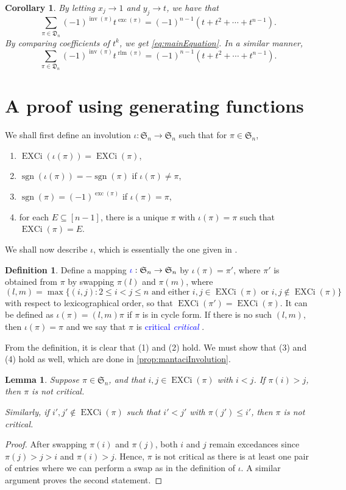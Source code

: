\documentclass[reqno]{amsart}
\newtheorem{lemma}[theorem]{Lemma}
\newtheorem{corollary}[theorem]{Corollary}
\theoremstyle{definition}
\newtheorem{definition}[theorem]{Definition}
\newcommand{\defin}[1]{%
\relax\ifmmode%
\textcolor{blue}{#1}%
\else\textcolor{blue}{\emph{#1}}%
\fi%
}
\newcommand{\symS}{\mathfrak{S}}
\newcommand{\dArr}{\mathfrak{D}}
\DeclareMathOperator{\inv}{inv}
\DeclareMathOperator{\sgn}{sgn}
\DeclareMathOperator{\exc}{exc}
\DeclareMathOperator{\EXCi}{EXCi}
\DeclareMathOperator{\rlm}{rlm}
\begin{document}
\begin{corollary}
By letting $x_j \to 1$ and $y_j \to t$, we have that 
\begin{equation*}
 \sum_{\pi \in \dArr_n} (-1)^{\inv(\pi)} t^{\exc(\pi)}
 =
 (-1)^{n-1}(t+t^2+\dotsb+t^{n-1}).
 \end{equation*}
By comparing coefficients of $t^k$,
we get \cref{eq:mainEquation}.
%
In a similar manner,
\begin{equation*}
\sum_{\pi \in \dArr_n} (-1)^{\inv(\pi)} t^{\rlm(\pi)}
 =
 (-1)^{n-1}(t+t^2+\dotsb+t^{n-1}).
\end{equation*}
\end{corollary}


\section{A proof using generating functions}\label{sec:genFunc}


We shall first define an involution
$\iota:\symS_n \to \symS_n$ such that for $\pi\in\symS_n$,
\begin{enumerate}
 \item $\EXCi(\iota(\pi))=\EXCi(\pi)$,
 \item $\sgn(\iota(\pi))=-\sgn(\pi)$ if $\iota(\pi)\neq\pi$,
 \item $\sgn(\pi)=(-1)^{\exc(\pi)}$ if $\iota(\pi)=\pi$,
 \item for each $E \subseteq [n-1]$, there is a unique $\pi$ with $\iota(\pi)=\pi$ such that $\EXCi(\pi)=E$.
\end{enumerate}
%
We shall now describe $\iota$,
which is essentially the one given in \cite{Mantaci1993}.


\begin{definition}
Define a mapping $\defin{\iota}: \symS_n \rightarrow \symS_n$ by 
$\iota(\pi)=\pi'$,
where $\pi'$ is obtained from $\pi$ by swapping $\pi(l)$ and $\pi(m)$,
where
\[
(l,m)=\max\{(i,j): 2\leq i<j\leq n\text{ and either }i, j\in \EXCi(\pi)\text{ or }i,j\notin \EXCi(\pi)\}
\] 
with respect to lexicographical order, so that $\EXCi(\pi')=\EXCi(\pi)$. 
It can be defined as $\iota(\pi)=(l,m)\pi $ if $\pi$ is in cycle form.
If there is no such $(l,m)$, then $\iota(\pi)=\pi$ and we say that $\pi$ is \defin{critical}.
\end{definition}
From the definition, it is clear that (1) and (2) hold.
We must show that (3) and (4) hold as well, which are done in \cref{prop:mantaciInvolution}.

\begin{lemma}
	Suppose $\pi \in \symS_n$, and that $i,j\in\EXCi(\pi)$ with $i<j$. If $\pi(i)>j$, then $\pi$ is not critical.
	
	Similarly, if $i',j'\notin\EXCi(\pi)$ such that $i'<j'$
	with $\pi(j')\leq i'$, then $\pi$ is not critical.
\end{lemma}
\begin{proof}
	After swapping $\pi(i)$ and $\pi(j)$,
	 both $i$ and $j$ remain excedances since $\pi(j)>j>i$
	and $\pi(i)>j$. Hence, $\pi$ is not critical as there is at least
	one pair of entries where  we can perform a swap as in the definition of $\iota$.
	A similar argument proves the second statement.
\end{proof}
\end{document}
